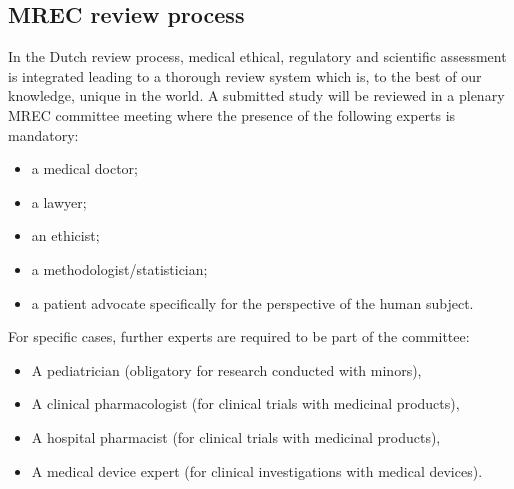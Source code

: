 \documentclass[authordate, empirical]{jote-new-article}
\begin{document}
	\subsection{MREC review process}



	In the Dutch review process, medical ethical, regulatory and scientific assessment is integrated leading to a thorough review system which is, to the best of our knowledge, unique in the world. A submitted study will be reviewed in a plenary MREC committee meeting where the presence of the following experts is mandatory:

	\begin{itemize}
		\item a medical doctor;



		\item a lawyer;



		\item an ethicist;



		\item a methodologist/statistician; 



		\item a patient advocate specifically for the perspective of the human subject.


	\end{itemize}

For specific cases, further experts are required to be part of the committee:

	\begin{itemize}


		\item A pediatrician (obligatory for research conducted with minors),



		\item
		A clinical pharmacologist (for clinical trials with medicinal products),



		\item A hospital pharmacist (for clinical trials with medicinal products),



		\item
		A medical device expert (for clinical investigations with medical devices).


	\end{itemize}
\end{document}
